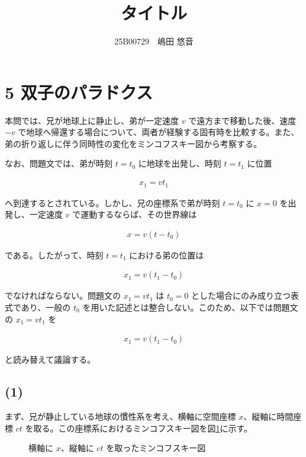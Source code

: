 \documentclass[platex,dvipdfmx,a4paper]{jsarticle}
\title{タイトル}
\author{25B00729　嶋田 悠音}
\begin{document}
\maketitle

\section*{5 双子のパラドクス}

本問では、兄が地球上に静止し、弟が一定速度 \(v\) で遠方まで移動した後、速度 \(-v\) で地球へ帰還する場合について、両者が経験する固有時を比較する。また、弟の折り返しに伴う同時性の変化をミンコフスキー図から考察する。

なお、問題文では、弟が時刻 \(t=t_0\) に地球を出発し、時刻 \(t=t_1\) に位置

\begin{align*}
  x_1=vt_1
\end{align*}

へ到達するとされている。しかし、兄の座標系で弟が時刻 \(t=t_0\) に \(x=0\) を出発し、一定速度 \(v\) で運動するならば、その世界線は

\begin{align*}
  x=v(t-t_0)
\end{align*}

である。したがって、時刻 \(t=t_1\) における弟の位置は

\begin{align*}
  x_1=v(t_1-t_0)
\end{align*}

でなければならない。問題文の \(x_1=vt_1\) は \(t_0=0\) とした場合にのみ成り立つ表式であり、一般の \(t_0\) を用いた記述とは整合しない。このため、以下では問題文の \(x_1=vt_1\) を

\begin{align*}
  x_1=v(t_1-t_0)
\end{align*}

と読み替えて議論する。

\subsection*{(1)}

まず、兄が静止している地球の慣性系を考え、横軸に空間座標 \(x\)、縦軸に時間座標 \(ct\) を取る。この座標系におけるミンコフスキー図を図\ref{fig:minkowski-coordinate}に示す。

\begin{figure}[H]
  \centering
  \caption{横軸に \(x\)、縦軸に \(ct\) を取ったミンコフスキー図}
  \label{fig:minkowski-coordinate}
\end{figure}
\end{document}
